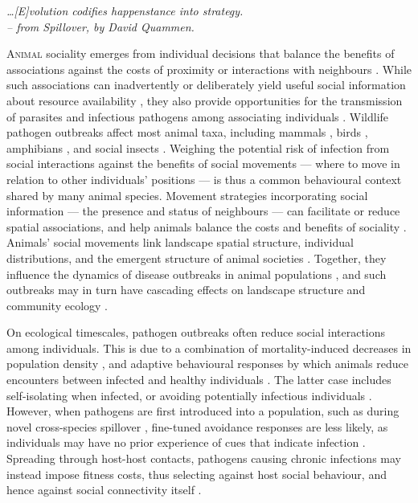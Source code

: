 
\begin{center}
    \emph{\ldots[E]volution codifies happenstance into strategy.\\
    \medskip
    -- \small{from Spillover, by David Quammen.}}
\end{center}

\lettrine{A}{nimal} sociality emerges from individual decisions that balance the benefits of associations against the costs of proximity or interactions with neighbours \autocite[][]{tanner2012,webber2018,webber2022,gil2018}.
While such associations can inadvertently or deliberately yield useful social information about resource availability \autocite{danchin2004,dall2005,gil2018}, they also provide opportunities for the transmission of parasites and infectious pathogens among associating individuals \autocite[][]{weinstein2018,romano2020,albery2021,cantor2021,romano2021}.
Wildlife pathogen outbreaks affect most animal taxa, including mammals \autocite{blehert2009,fereidouni2019,chandler2021,kuchipudi2022}, birds \autocite{wille2022}, amphibians \autocite{scheele2019}, and social insects \autocite{goulson2015}.
Weighing the potential risk of infection from social interactions against the benefits of social movements --- where to move in relation to other individuals' positions --- is thus a common behavioural context shared by many animal species.
Movement strategies incorporating social information --- the presence and status of neighbours --- can facilitate or reduce spatial associations, and help animals balance the costs and benefits of sociality \autocite{albery2021,gil2018,webber2018,webber2022}.
Animals' social movements link landscape spatial structure, individual distributions, and the emergent structure of animal societies \autocite{gil2018,webber2022,kurvers2014}.
Together, they influence the dynamics of disease outbreaks in animal populations \autocite{white2018a,romano2020,romano2021,keeling2001}, and such outbreaks may in turn have cascading effects on landscape structure and community ecology \autocite{monk2022}.

On ecological timescales, pathogen outbreaks often reduce social interactions among individuals.
This is due to a combination of mortality-induced decreases in population density \autocite[e.g.][]{fereidouni2019,monk2022}, and adaptive behavioural responses by which animals reduce encounters between infected and healthy individuals \autocite{stroeymeyt2018,pusceddu2021,stockmaier2021,weinstein2018}.
The latter case includes self-isolating when infected, or avoiding potentially infectious individuals \autocite{stroeymeyt2018,pusceddu2021,stockmaier2021,weinstein2018}.
However, when pathogens are first introduced into a population, such as during novel cross-species spillover \autocite{kuchipudi2022,chandler2021}, fine-tuned avoidance responses are less likely, as individuals may have no prior experience of cues that indicate infection \autocite{weinstein2018,stockmaier2021}.
Spreading through host-host contacts, pathogens causing chronic infections \autocite{bastos2000,jolles2021,vosloo2009} may instead impose fitness costs, thus selecting against host social behaviour, and hence against social connectivity itself \autocite{altizer2003,cantor2021,romano2021,poulin2021,ashby2022}.

